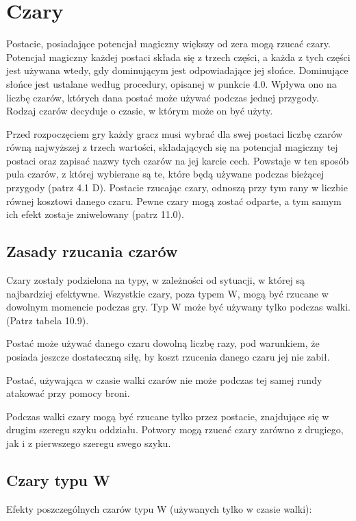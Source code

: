 \section{Czary}

Postacie, posiadające potencjał magiczny większy od zera mogą rzucać czary.
Potencjał magiczny każdej postaci składa się z trzech części, a każda z tych części jest używana wtedy, gdy dominującym jest odpowiadające jej słońce.
Dominujące słońce jest ustalane według procedury, opisanej w punkcie 4.0.
Wpływa ono na liczbę czarów, których dana postać może używać podczas jednej przygody.
Rodzaj czarów decyduje o czasie, w którym może on być użyty.

Przed rozpoczęciem gry każdy gracz musi wybrać dla swej postaci liczbę czarów równą najwyższej z trzech wartości, składających się na potencjał magiczny tej postaci oraz zapisać nazwy tych czarów na jej karcie cech.
Powstaje w ten sposób pula czarów, z której wybierane są te, które będą używane podczas bieżącej przygody (patrz 4.1 D).
Postacie rzucając czary, odnoszą przy tym rany w liczbie równej kosztowi danego czaru.
Pewne czary mogą zostać odparte, a tym samym ich efekt zostaje zniwelowany (patrz 11.0).

\subsection{Zasady rzucania czarów}

Czary zostały podzielona na typy, w zależności od sytuacji, w której są najbardziej efektywne.
Wszystkie czary, poza typem W, mogą być rzucane w dowolnym momencie podczas gry.
Typ W może być używany tylko podczas walki. (Patrz tabela 10.9).

Postać może używać danego czaru dowolną liczbę razy, pod warunkiem, że posiada jeszcze dostateczną siłę, by koszt rzucenia danego czaru jej nie zabił.

Postać, używająca w czasie walki czarów nie może podczas tej samej rundy atakować przy pomocy broni.

Podczas walki czary mogą być rzucane tylko przez postacie, znajdujące się w drugim szeregu szyku oddziału.
Potwory mogą rzucać czary zarówno z drugiego, jak i z pierwszego szeregu swego szyku.

\subsection{Czary typu W}

Efekty poszczególnych czarów typu W (używanych tylko w czasie walki):

